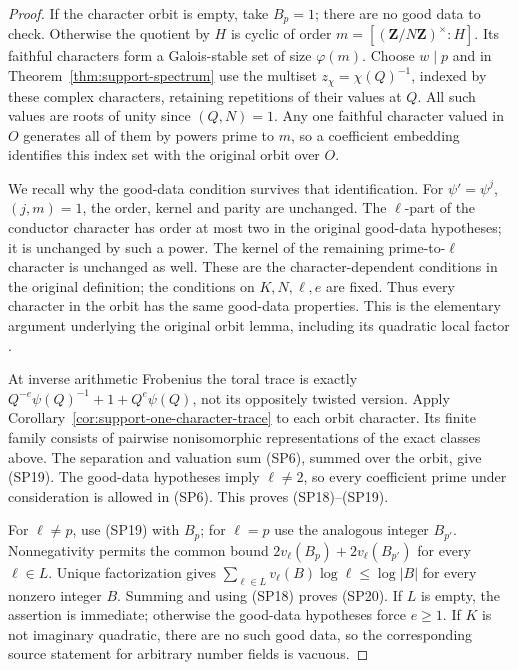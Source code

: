 \begin{proof}
If the character orbit is empty, take $B_p=1$; there are no
good data to check.  Otherwise the quotient by $H$ is
cyclic of order $m=[(\mathbf Z/N\mathbf Z)^\times:H]$.
Its faithful characters form a Galois-stable set of size
$\varphi(m)$.  Choose $w\mid p$ and in Theorem~\ref{thm:support-spectrum}
use the multiset $z_\chi=\chi(Q)^{-1}$, indexed by these complex
characters, retaining repetitions of their values at $Q$.
All such values are roots of unity since $(Q,N)=1$.
Any one faithful character valued in $O$ generates all of them
by powers prime to $m$, so a coefficient embedding identifies
this index set with the original orbit over $O$.

We recall why the good-data condition survives that identification.
For $\psi' =\psi^j$, $(j,m)=1$, the order, kernel and parity
are unchanged.  The $\ell$-part of the conductor character
has order at most two in the original good-data hypotheses;
it is unchanged by such a power.  The kernel of the
remaining prime-to-$\ell$ character is unchanged as well.
These are the character-dependent conditions in the original
definition; the conditions on $K,N,\ell,e$ are fixed.
Thus every character in the orbit has the same good-data
properties.  This is the elementary argument underlying
the original orbit lemma, including its quadratic local
factor \cite{support-spectrum-orbit-source}.

At inverse arithmetic Frobenius the toral trace is exactly
$Q^{-e}\psi(Q)^{-1}+1+Q^e\psi(Q)$, not its oppositely
twisted version.  Apply
Corollary~\ref{cor:support-one-character-trace} to each orbit
character.  Its finite family consists of pairwise
nonisomorphic representations of the exact classes above.
The separation and valuation sum (SP6), summed over the
orbit, give (SP19).  The good-data hypotheses imply
$\ell\ne2$, so every coefficient prime under consideration
is allowed in (SP6).  This proves (SP18)--(SP19).

For $\ell\ne p$, use (SP19) with $B_p$; for $\ell=p$ use
the analogous integer $B_{p'}$.  Nonnegativity permits the
common bound $2v_\ell(B_p)+2v_\ell(B_{p'})$ for every
$\ell\in L$.  Unique factorization gives
$\sum_{\ell\in L}v_\ell(B)\log\ell\le\log|B|$ for every
nonzero integer $B$.  Summing and using (SP18) proves (SP20).
If $L$ is empty, the assertion is immediate; otherwise the
good-data hypotheses force $e\ge1$.  If $K$ is not imaginary
quadratic, there are no such good data, so the corresponding
source statement for arbitrary number fields is vacuous.
\end{proof}

